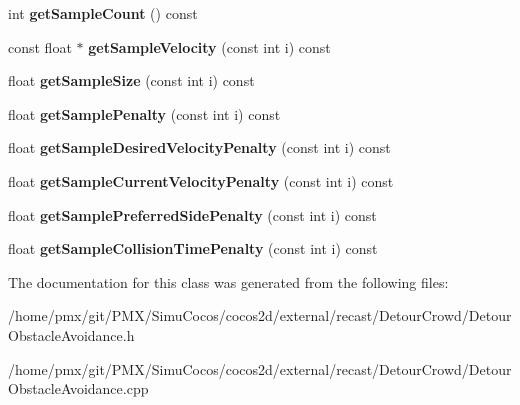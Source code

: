 \begin{DoxyCompactItemize}
int {\bfseries get\+Sample\+Count} () const
\item 
\mbox{\label{classdtObstacleAvoidanceDebugData_a682696e8fc9185544690fe3391c9b613}} 
const float $\ast$ {\bfseries get\+Sample\+Velocity} (const int i) const
\item 
\mbox{\label{classdtObstacleAvoidanceDebugData_a87816c09e68ea4d93a01b54b2b5025b1}} 
float {\bfseries get\+Sample\+Size} (const int i) const
\item 
\mbox{\label{classdtObstacleAvoidanceDebugData_a3bde3898f9ed1ada5e487010e502e4fd}} 
float {\bfseries get\+Sample\+Penalty} (const int i) const
\item 
\mbox{\label{classdtObstacleAvoidanceDebugData_aa18a04d3c916740d7ddbd8d747de4e0f}} 
float {\bfseries get\+Sample\+Desired\+Velocity\+Penalty} (const int i) const
\item 
\mbox{\label{classdtObstacleAvoidanceDebugData_ae6bce4f174195e5b114a79c13fc46c02}} 
float {\bfseries get\+Sample\+Current\+Velocity\+Penalty} (const int i) const
\item 
\mbox{\label{classdtObstacleAvoidanceDebugData_a54805fdf39b6fb3d294c0610f051b1a0}} 
float {\bfseries get\+Sample\+Preferred\+Side\+Penalty} (const int i) const
\item 
\mbox{\label{classdtObstacleAvoidanceDebugData_a57737b7b4d07179326e69c70032a9f71}} 
float {\bfseries get\+Sample\+Collision\+Time\+Penalty} (const int i) const
\end{DoxyCompactItemize}


The documentation for this class was generated from the following files\+:\begin{DoxyCompactItemize}
\item 
/home/pmx/git/\+P\+M\+X/\+Simu\+Cocos/cocos2d/external/recast/\+Detour\+Crowd/Detour\+Obstacle\+Avoidance.\+h\item 
/home/pmx/git/\+P\+M\+X/\+Simu\+Cocos/cocos2d/external/recast/\+Detour\+Crowd/Detour\+Obstacle\+Avoidance.\+cpp\end{DoxyCompactItemize}
